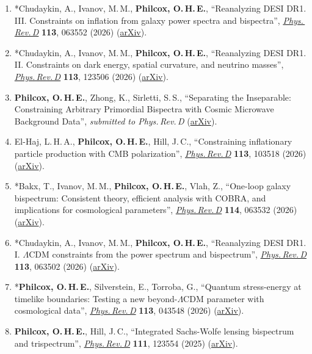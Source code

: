 \begin{enumerate}
    \item *Chudaykin, A., Ivanov, M.\,M., \textbf{Philcox, O.\,H.\,E.}, ``Reanalyzing DESI DR1. III. Constraints on inflation from galaxy power spectra and bispectra'', \href{https://doi.org/10.1103/fhj3-6q4x}{\textit{Phys.\,Rev.\,D}} \textbf{113}, 063552 (2026) (\href{https://arxiv.org/abs/2512.04266}{arXiv}).
    \item *Chudaykin, A., Ivanov, M.\,M., \textbf{Philcox, O.\,H.\,E.}, ``Reanalyzing DESI DR1. II. Constraints on dark energy, spatial curvature, and neutrino masses'', \href{https://doi.org/10.1103/42f4-grkj}{\textit{Phys.\,Rev.\,D}} \textbf{113}, 123506 (2026) (\href{https://arxiv.org/abs/2511.20757}{arXiv}).
    \item \textbf{Philcox, O.\,H.\,E.}, Zhong, K., Sirletti, S.\,S., ``Separating the Inseparable: Constraining Arbitrary Primordial Bispectra with Cosmic Microwave Background Data'', \textit{submitted to Phys.\,Rev.\,D} (\href{https://arxiv.org/abs/2511.19179}{arXiv}).
    \item El-Haj, L.\,H.\,A., \textbf{Philcox, O.\,H.\,E.}, Hill, J.\,C., ``Constraining inflationary particle production with CMB polarization'', \href{https://doi.org/10.1103/937w-2q1v}{\textit{Phys.\,Rev.\,D}} \textbf{113}, 103518 (2026) (\href{https://arxiv.org/abs/2509.23123}{arXiv}).
    \item *Bakx, T., Ivanov, M.\,M., \textbf{Philcox, O.\,H.\,E.}, Vlah, Z., ``One-loop galaxy bispectrum: Consistent theory, efficient analysis with COBRA, and implications for cosmological parameters'', \href{https://doi.org/10.1103/zhcf-7cgh}{\textit{Phys.\,Rev.\,D}} \textbf{114}, 063532 (2026) (\href{https://arxiv.org/abs/2507.22110}{arXiv}).
    \item *Chudaykin, A., Ivanov, M.\,M., \textbf{Philcox, O.\,H.\,E.}, ``Reanalyzing DESI DR1. I. $\Lambda$CDM constraints from the power spectrum and bispectrum'', \href{https://doi.org/10.1103/qsnt-dppc}{\textit{Phys.\,Rev.\,D}} \textbf{113}, 063502 (2026) (\href{https://arxiv.org/abs/2507.13433}{arXiv}).
    \item *\textbf{Philcox, O.\,H.\,E.}, Silverstein, E., Torroba, G., ``Quantum stress-energy at timelike boundaries: Testing a new beyond-$\Lambda$CDM parameter with cosmological data'', \href{https://doi.org/10.1103/162y-rmsv}{\textit{Phys.\,Rev.\,D}} \textbf{113}, 043548 (2026) (\href{https://arxiv.org/abs/2507.00115}{arXiv}).
    \item \textbf{Philcox, O.\,H.\,E.}, Hill, J.\,C., ``Integrated Sachs-Wolfe lensing bispectrum and trispectrum'', \href{https://doi.org/10.1103/wsjw-32l6}{\textit{Phys.\,Rev.\,D}} \textbf{111}, 123554 (2025) (\href{https://arxiv.org/abs/2504.03826}{arXiv}).

\end{enumerate}
